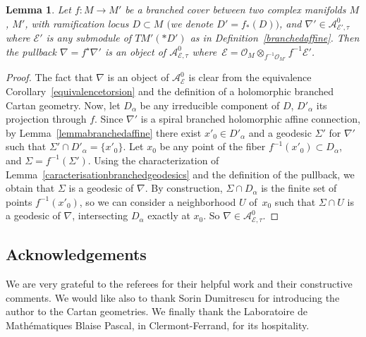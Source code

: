 \documentclass[pdftex]{sigma}
\numberwithin{equation}{section}
\newtheorem{Lemma}[Theorem]{Lemma}
\begin{document}
 \begin{Lemma} Let $f\colon M\longrightarrow M'$ be a branched cover between two complex manifolds $M$, $M'$, with ramification locus $D\subset M$ $($we denote $D'=f_*(D))$, and $\nabla' \in \mathcal{A}^0_{\mathcal{E}',\tau}$ where $\mathcal{E}'$ is any submodule of $TM'(* D')$ as in Definition~{\rm \ref{branchedaffine}}. Then the pullback $\nabla=f^\star \nabla'$ is an object of $\mathcal{A}^0_{\mathcal{E},\tau}$ where~$\mathcal{E}=\mathcal{O}_M \otimes_{f^{-1}\mathcal{O}_{M'}} f^{-1} \mathcal{E}'$. \end{Lemma}

  \begin{proof} The fact that $\nabla$ is an object of $\mathcal{A}^0_{\mathcal{E}}$ is clear from the equivalence Corollary~\ref{equivalencetorsion} and the definition of a holomorphic branched Cartan geometry. Now, let $D_\alpha$ be any irreducible component of $D$, $D'_\alpha$ its projection through $f$. Since $\nabla'$ is a spiral branched holomorphic affine connection, by Lemma~\ref{lemmabranchedaffine} there exist $x'_0 \in D'_\alpha$ and a geodesic $\Sigma'$ for $\nabla'$ such that $\Sigma'\cap D'_\alpha = \{x'_0\}$. Let $x_0$ be any point of the fiber $f^{-1}(x'_0) \subset D_\alpha$, and $\Sigma=f^{-1}(\Sigma')$. Using the characterization of Lemma~\ref{caracterisationbranchedgeodesics} and the definition of the pullback, we obtain that $\Sigma$ is a geodesic of $\nabla$. By construction, $\Sigma \cap D_\alpha$ is the finite set of points $f^{-1}(x'_0)$, so we can consider a neighborhood $U$ of~$x_0$ such that $\Sigma\cap U$ is a geodesic of $\nabla$, intersecting $D_\alpha$ exactly at $x_0$. So $\nabla \in \mathcal{A}^0_{\mathcal{E},\tau}$.
\end{proof}

\vspace{-1mm}

\subsection*{Acknowledgements}
We are very grateful to the referees for their helpful work and their constructive comments.
We would like also to thank Sorin Dumitrescu for introducing the author to the Cartan geometries. We finally thank the Laboratoire de Math\'ematiques Blaise Pascal, in Clermont-Ferrand, for its hospitality.
\end{document}
